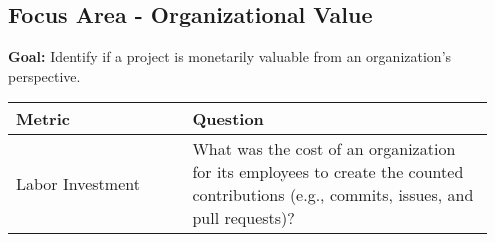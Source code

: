 
\subsection{Focus Area - Organizational Value}
\textbf{Goal:} Identify if a project is monetarily valuable from an organization's perspective.
\begin{table}[ht!]
    \centering
    \begin{tabular}{|p{0.35\linewidth} | p{0.6\linewidth}|}
        \hline
        \hfil \textbf{Metric}  & \hfil \textbf{Question} \\
        \hline
    		Labor Investment & What was the cost of an organization for its employees to create the counted contributions (e.g., commits, issues, and pull requests)? \\ 
		\hline
    \end{tabular}
\end{table}
    
 
